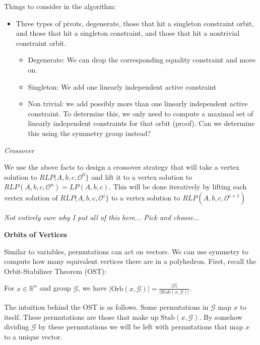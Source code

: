 \documentclass[runningheads]{llncs}
\newcommand{\cG}{{\mathcal G}}
\newcommand{\cO}{{\mathcal O}}
\begin{document}
    Things to consider in the algorithm:
    \begin{itemize}
    \item Three types of pivots, degenerate, those that hit a singleton
      constraint orbit, and those that hit a singleton constraint, and those
      that hit a nontrivial constraint orbit.
      \begin{itemize}
      \item Degenerate: We can drop the corresponding equality constraint and
        move on.
      \item Singleton: We add one linearly independent active constraint
        \item Non trivial: we add possibly more than one linearly independent
          active constraint. To determine this, we only need to compute a
          maximal set of linearly independent constraints for that orbit
          (proof). Can we determine this using the symmetry group instead?
      \end{itemize}
      \end{itemize}
      

{\em Crossover}

We use the above facts to design a crossover strategy that will take a vertex
solution to $RLP(A,b,c,\cO^0\}$ and  lift it to a vertex solution to
  $RLP(A,b,c,\cO^n) = LP(A,b,c)$. This will be done iteratively by lifting each
vertex solution of  $RLP(A,b,c,\cO^i\}$  to a vertex solution to
  $RLP(A,b,c,\cO^{i+1})$ 



{\em Not entirely sure why I put all of this here... Pick and choose...}


{\bf Orbits of Vertices}

Similar to variables, permutations can act on vectors. We can use symmetry to
compute how many equivalent vertices there are in a polyhedron. First, recall
the Orbit-Stabilizer Theorem (OST):

\begin{theorem}
For $x \in \mathbb{R}^n$ and group $\cG$, we have $|\mbox{Orb}(x,\cG)| = \frac{ |\cG|}{|\mbox{Stab}(x,\cG)|}$.
  \end{theorem}

The intuition behind the OST is as follows. Some
permutations in $\cG$ map $x$ to itself. These permutations are those that make
up $\mbox{Stab}(x,\cG)$. By somehow dividing $\cG$ by these permutations we will
be left with permutations that map $x$ to a unique vector.
\end{document}
